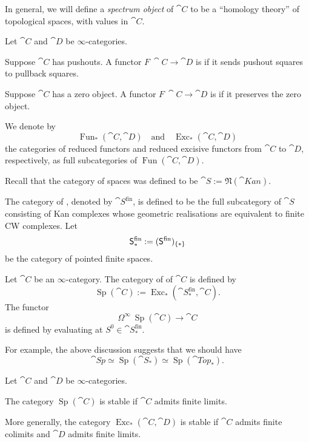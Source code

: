 In general, we will define a \emph{spectrum object} of $\cat{C}$
to be a ``homology theory'' of topological spaces,
with values in $\cat{C}$.

\begin{definition}
    Let $\cat{C}$ and $\cat{D}$ be $\infty$-categories.
    \begin{itms}
        \item Suppose $\cat{C}$ has pushouts.
        A functor $F\:\cat{C}\to\cat{D}$ is 
        if it sends pushout squares to pullback squares.
        \item Suppose $\cat{C}$ has a zero object.
        A functor $F\:\cat{C}\to\cat{D}$ is 
        if it preserves the zero object.
    \end{itms}
    We denote by 
    \[\operatorname{Fun}_*(\cat{C},\cat{D})\quad\text{and}\quad
    \operatorname{Exc}_*(\cat{C},\cat{D})\]
    the categories of reduced functors and reduced excisive functors 
    from $\cat{C}$ to $\cat{D}$, respectively,
    as full subcategories of $\operatorname{Fun}(\cat{C},\cat{D})$.
\end{definition}

Recall that the category of spaces was defined to be
$\cat{S}:=\mathfrak{N}(\cat{Kan})$.

\begin{definition}
    The category of , denoted by $\cat{S}^{\mathrm{fin}}$,
    is defined to be the full subcategory of $\cat{S}$
    consisting of Kan complexes whose geometric realisations
    are equivalent to finite CW complexes. Let
    \[\mathsf{S}_*^{\mathrm{fin}}:=(\mathsf{S}^{\mathrm{fin}})_{\{*\}\/}\]
    be the category of pointed finite spaces.
\end{definition}

\begin{definition}
    Let $\cat{C}$ be an $\infty$-category.
    The category of  of $\cat{C}$
    is defined by 
    \[\operatorname{Sp}(\cat{C}):=
    \operatorname{Exc}_*(\cat{S}_*^{\mathrm{fin}},\cat{C}).\]
    The functor 
    \[\Omega^\infty\:\operatorname{Sp}(\cat{C})\to\cat{C}\]
    is defined by evaluating at $S^0\in\cat{S}_*^{\mathrm{fin}}$.
\end{definition}

For example, the above discussion suggests that we should have
\[\cat{Sp}\simeq\operatorname{Sp}(\cat{S}_*)\simeq\operatorname{Sp}(\cat{Top}_*).\]

\begin{proposition}
    Let $\cat{C}$ and $\cat{D}$ be $\infty$-categories.

    \begin{itms}
        \item
        The category $\operatorname{Sp}(\cat{C})$ is stable
        if $\cat{C}$ admits finite limits.

        \item
        More generally, the category $\operatorname{Exc}_*(\cat{C},\cat{D})$
        is stable if $\cat{C}$ admits finite colimits and 
        $\cat{D}$ admits finite limits.
    \end{itms}
\end{proposition}

